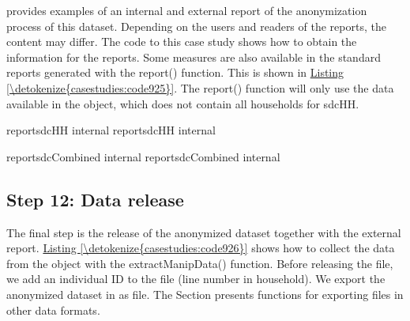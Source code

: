 \documentclass[letterpaper,10pt,english]{sphinxmanual}
\begin{document}
provides examples of an internal and external report of the
anonymization process of this dataset. Depending on the users and
readers of the reports, the content may differ. The code to this case
study shows how to obtain the information for the reports. Some measures
are also available in the standard reports generated with the report()
function. This is shown in \hyperref[\detokenize{casestudies:code925}]{Listing \ref{\detokenize{casestudies:code925}}}. The report() function will only
use the data available in the  object, which does not contain
all households for sdcHH.

\def\sphinxLiteralBlockLabel{\label{\detokenize{casestudies:code925}}}
%
\begin{sphinxVerbatim}[commandchars=\\\{\},numbers=left,firstnumber=1,stepnumber=1]
reportsdcHH internal   
reportsdcHH internal   

reportsdcCombined internal   
reportsdcCombined internal   
\end{sphinxVerbatim}


\subsection{Step 12: Data release}
\label{\detokenize{casestudies:step-12-data-release}}
The final step is the release of the anonymized dataset together with
the external report. \hyperref[\detokenize{casestudies:code926}]{Listing \ref{\detokenize{casestudies:code926}}} shows how to collect the data from the
 object with the extractManipData() function. Before releasing
the file, we add an individual ID to the file (line number in
household). We export the anonymized dataset in as  file. The Section
presents functions for exporting files in other data formats.
\end{document}

